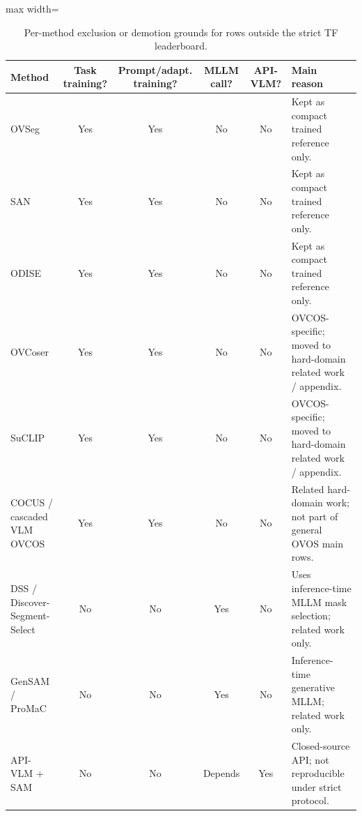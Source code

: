 \documentclass[11pt,a4paper]{article}
\begin{document}
\begin{table}[H]
\centering
\scriptsize
\caption{Per-method exclusion or demotion grounds for rows outside the strict TF leaderboard.}
\label{tab:appendix-exclusion}
\begin{adjustbox}{max width=\textwidth}
\begin{tabular}{l c c c c p{}}
\toprule
Method & Task training? & Prompt/adapt. training? & MLLM call? & API-VLM? & Main reason \\
\midrule
OVSeg & Yes & Yes & No & No & Kept as compact trained reference only. \\
SAN & Yes & Yes & No & No & Kept as compact trained reference only. \\
ODISE & Yes & Yes & No & No & Kept as compact trained reference only. \\
OVCoser & Yes & Yes & No & No & OVCOS-specific; moved to hard-domain related work / appendix. \\
SuCLIP & Yes & Yes & No & No & OVCOS-specific; moved to hard-domain related work / appendix. \\
COCUS / cascaded VLM OVCOS & Yes & Yes & No & No & Related hard-domain work; not part of general OVOS main rows. \\
DSS / Discover-Segment-Select & No & No & Yes & No & Uses inference-time MLLM mask selection; related work only. \\
GenSAM / ProMaC & No & No & Yes & No & Inference-time generative MLLM; related work only. \\
API-VLM + SAM & No & No & Depends & Yes & Closed-source API; not reproducible under strict protocol. \\
\bottomrule
\end{tabular}
\end{adjustbox}
\end{table}
\end{document}

